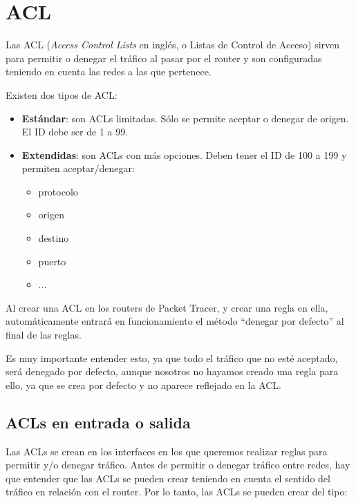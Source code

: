 \section{ACL}
Las ACL (\textit{Access Control Lists} en inglés, o Listas de Control de Acceso) sirven para permitir o denegar el tráfico al pasar por el router y son configuradas teniendo en cuenta las redes a las que pertenece.

Existen dos tipos de ACL:
\begin{itemize}
    \item \textbf{Estándar}: son ACLs limitadas. Sólo se permite aceptar o denegar de origen. El ID debe ser de 1 a 99.
    \item \textbf{Extendidas}: son ACLs con más opciones. Deben tener el ID de 100 a 199 y permiten aceptar/denegar:
    \begin{itemize}
        \item protocolo
        \item origen
        \item destino
        \item puerto
        \item ...
    \end{itemize}
\end{itemize}

Al crear una ACL en los routers de Packet Tracer, y crear una regla en ella, automáticamente entrará en funcionamiento el método “denegar por defecto” al final de las reglas.


Es muy importante entender esto, ya que todo el tráfico que no esté aceptado, será denegado por defecto, aunque nosotros no hayamos creado una regla para ello, ya que se crea por defecto y no aparece reflejado en la ACL.



\subsection{ACLs en entrada o salida}
Las ACLs se crean en los interfaces en los que queremos realizar reglas para permitir y/o denegar tráfico. Antes de permitir o denegar tráfico entre redes, hay que entender que las ACLs se pueden crear teniendo en cuenta el sentido del tráfico en relación con el router. Por lo tanto, las ACLs se pueden crear del tipo:

